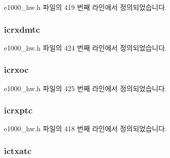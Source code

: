 e1000\+\_\+hw.\+h 파일의 419 번째 라인에서 정의되었습니다.

\subsubsection[{\texorpdfstring{icrxdmtc}{icrxdmtc}}]{ icrxdmtc}\hypertarget{structe1000__hw__stats_a9211c0a358973eef7d0e99a595c4439d}{}\label{structe1000__hw__stats_a9211c0a358973eef7d0e99a595c4439d}


e1000\+\_\+hw.\+h 파일의 424 번째 라인에서 정의되었습니다.

\subsubsection[{\texorpdfstring{icrxoc}{icrxoc}}]{ icrxoc}\hypertarget{structe1000__hw__stats_ad4b569918befc62b1085f0c3b3227bb2}{}\label{structe1000__hw__stats_ad4b569918befc62b1085f0c3b3227bb2}


e1000\+\_\+hw.\+h 파일의 425 번째 라인에서 정의되었습니다.

\subsubsection[{\texorpdfstring{icrxptc}{icrxptc}}]{ icrxptc}\hypertarget{structe1000__hw__stats_a78ccf4ea18280715298f338c2621fce9}{}\label{structe1000__hw__stats_a78ccf4ea18280715298f338c2621fce9}


e1000\+\_\+hw.\+h 파일의 418 번째 라인에서 정의되었습니다.

\subsubsection[{\texorpdfstring{ictxatc}{ictxatc}}]{ ictxatc}\hypertarget{structe1000__hw__stats_aade384e2287e919e91665a6b0334f9da}{}\label{structe1000__hw__stats_aade384e2287e919e91665a6b0334f9da}


